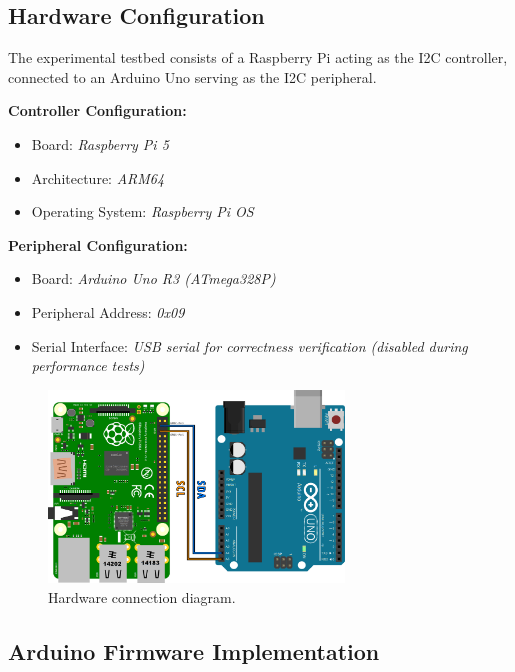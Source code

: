 \subsection{Hardware Configuration}
\label{subsec:hardware-config}

The experimental testbed consists of a Raspberry Pi acting as the I2C controller, connected to an Arduino Uno serving as the I2C peripheral.

\textbf{Controller Configuration:}
\begin{itemize}
    \item Board: \textit{Raspberry Pi 5}
    \item Architecture: \textit{ARM64} %
    \item Operating System: \textit{Raspberry Pi OS}
\end{itemize}

\textbf{Peripheral Configuration:}
\begin{itemize}
    \item Board: \textit{Arduino Uno R3 (ATmega328P)}
    \item Peripheral Address: \textit{0x09}
    \item Serial Interface: \textit{USB serial for correctness verification (disabled during performance tests)}
\end{itemize}

\begin{figure}[h]
	\centering
	\includegraphics[width=0.7\textwidth]{images/HW_config.png}
	\caption{Hardware connection diagram.}
	\label{fig:hw-connection}
\end{figure}

\subsection{Arduino Firmware Implementation}
\label{subsec:arduino-firmware}

